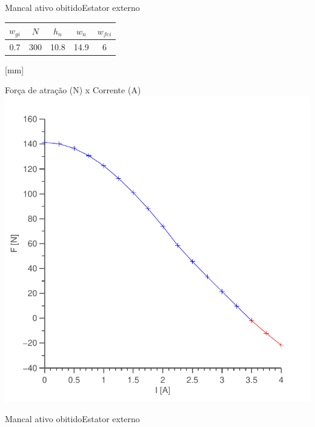 \documentclass{beamer}
\begin{document}
\begin{frame}{Mancal ativo obitido}{Estator externo}
\centering

	\begin{tabular}{c c c c c}
		 $w_{gi}$ 	& $N$ & $h_n$ & $w_n$ & $w_{fei}$  \\ \hline \hline
		 0.7		& 300  	& 10.8 	& 14.9	& 6
	\end{tabular} 
	
\hfill [mm]	

\begin{center}
Força de atração (N) x Corrente (A)
\includegraphics[width=0.55\linewidth]{Simulacoes/Ativo/ativo_otimizado_fem_I_dx03}
\end{center}

\end{frame}

\begin{frame}{Mancal ativo obitido}{Estator externo}
\end{frame}

%
%
%
%
%
%
%
%
%
%
\end{document}
